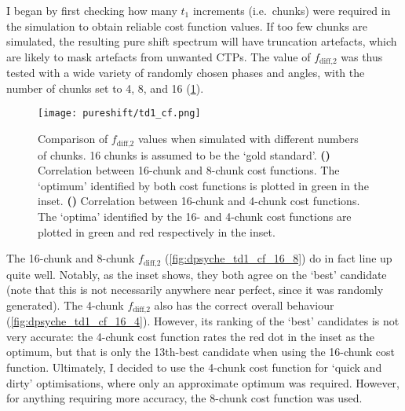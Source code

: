 I began by first checking how many $t_1$ increments (i.e.\ chunks) were required in the simulation to obtain reliable cost function values.
If too few chunks are simulated, the resulting pure shift spectrum will have truncation artefacts, which are likely to mask artefacts from unwanted CTPs.
The value of $f_\text{diff,2}$ was thus tested with a wide variety of randomly chosen phases and angles, with the number of chunks set to 4, 8, and 16 (\cref{fig:dpsyche_td1_cf}).

\begin{figure}[htb]
    \centering
    \texttt{[image: pureshift/td1\_cf.png]}%
    {\label{fig:dpsyche_td1_cf_16_8}}%
    {\label{fig:dpsyche_td1_cf_16_4}}%
    \caption[Comparison of $f_\text{diff,2}$ cost function with different numbers of chunks]{
        Comparison of $f_\text{diff,2}$ values when simulated with different numbers of chunks.
        16 chunks is assumed to be the `gold standard'.
        \textbf{()} Correlation between 16-chunk and 8-chunk cost functions.
        The `optimum' identified by both cost functions is plotted in green in the inset.
        \textbf{()} Correlation between 16-chunk and 4-chunk cost functions.
        The `optima' identified by the 16- and 4-chunk cost functions are plotted in green and red respectively in the inset.
    }
    \label{fig:dpsyche_td1_cf}
\end{figure}

The 16-chunk and 8-chunk $f_\text{diff,2}$ (\cref{fig:dpsyche_td1_cf_16_8}) do in fact line up quite well.
Notably, as the inset shows, they both agree on the `best' candidate (note that this is not necessarily anywhere near perfect, since it was randomly generated).
The 4-chunk $f_\text{diff,2}$ also has the correct overall behaviour (\cref{fig:dpsyche_td1_cf_16_4}).
However, its ranking of the `best' candidates is not very accurate: the 4-chunk cost function rates the red dot in the inset as the optimum, but that is only the 13th-best candidate when using the 16-chunk cost function.
Ultimately, I decided to use the 4-chunk cost function for `quick and dirty' optimisations, where only an approximate optimum was required.
However, for anything requiring more accuracy, the 8-chunk cost function was used.

